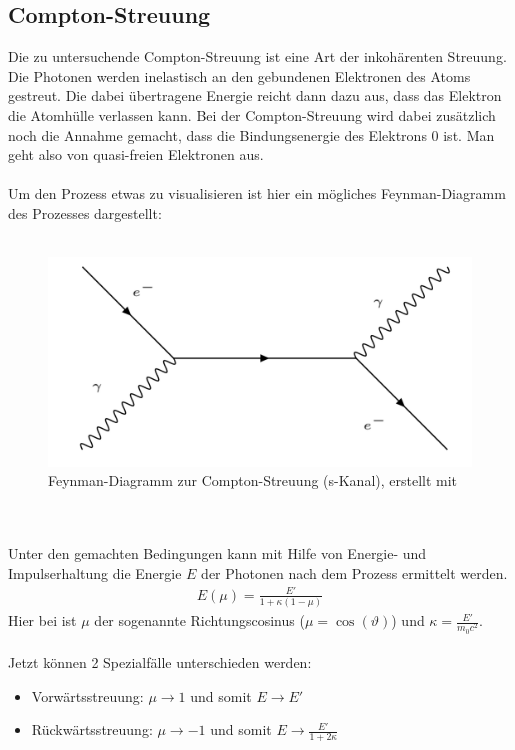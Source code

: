 \documentclass[german,  %
parskip=full,  %
]{scrartcl}
\begin{document}
\subsection{Compton-Streuung}
Die zu untersuchende Compton-Streuung ist eine Art der inkohärenten Streuung. Die Photonen werden inelastisch an den gebundenen Elektronen des Atoms gestreut. Die dabei übertragene Energie reicht dann dazu aus, dass das Elektron die Atomhülle verlassen kann. Bei der Compton-Streuung wird dabei zusätzlich noch die Annahme gemacht, dass die Bindungsenergie des Elektrons $0$ ist. Man geht also von quasi-freien Elektronen aus.
\\\\
\newpage
Um den Prozess etwas zu visualisieren ist hier ein mögliches Feynman-Diagramm des Prozesses dargestellt:
\\\\
\begin{figure}[h!]\centering
\includegraphics[scale=0.4]{feynman}
\caption{Feynman-Diagramm zur Compton-Streuung (s-Kanal), erstellt mit \cite{feynman}}
\end{figure}
\\\\
Unter den gemachten Bedingungen kann mit Hilfe von Energie- und Impulserhaltung die Energie $E$ der Photonen nach dem Prozess ermittelt werden.
\begin{align}
\label{energiewinkel}
E(\mu) = \frac{E'}{1+ \kappa (1-\mu)}
\end{align}
Hier bei ist $\mu$ der sogenannte Richtungscosinus ($\mu =\cos(\vartheta)$) und $\kappa = \frac{E'}{m_{0}c^2}$.
\\\\
Jetzt können 2 Spezialfälle unterschieden werden:
\begin{itemize}
\item Vorwärtsstreuung: $\mu \rightarrow 1$ und somit $E \rightarrow E'$
\\
\item Rückwärtsstreuung: $\mu \rightarrow -1$ und somit $E \rightarrow \frac{E'}{1+2\kappa}$
\end{itemize}
\end{document}
